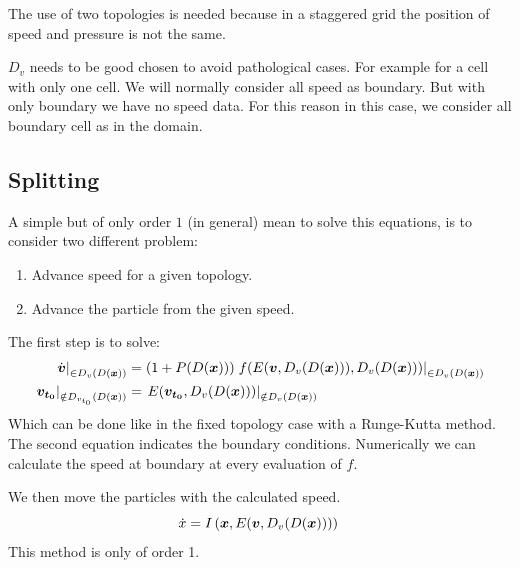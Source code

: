 The use of two topologies is needed because in a staggered grid the position of speed and pressure is not the same.

\begin{remark}
$D_{v}$ needs to be good chosen to avoid pathological cases.
For example for a cell with only one cell. We will normally consider all speed as boundary. But with only boundary we have no speed data.
For this reason in this case, we consider all boundary cell as in the domain.
\end{remark}


\subsection{Splitting}
\label{splitting}

A simple but of only order $1$ (in general) mean to solve this equations, is to consider two different problem:
\begin{enumerate}
	\item Advance speed for a given topology.
	\item Advance the particle from the given speed.
\end{enumerate}
The first step is to solve:
\begin{align}
\left.\dot{{\boldsymbol {v}}}\right|_{\in D_{v}(D({\boldsymbol {x}}))}&=\left(1+P(D({\boldsymbol {x}}))\right)\left.f(E({\boldsymbol {v}},D_v(D({\boldsymbol {x}}))),D_{v}(D({\boldsymbol {x}})))\right|_{\in D_{v}(D({\boldsymbol {x}}))}\\
	\left.{\boldsymbol {v_{t_0}}}\right|_{\notin D_{v_{t_0}}(D({\boldsymbol {x}}))}&=\left.E({\boldsymbol {v_{t_0}}},D_v(D({\boldsymbol {x}})))\right|_{\notin D_{v}(D({\boldsymbol {x}}))}
\end{align}
Which can be done like in the fixed topology case with a Runge-Kutta method. The second equation indicates the boundary conditions.
Numerically we can calculate the speed at boundary at every evaluation of $f$.

We then move the particles with the calculated speed.
\begin{equation}
	\dot{x}=I\left({\boldsymbol {x}},E({\boldsymbol {v}},D_v(D({\boldsymbol {x}})))\right)\\
\end{equation}
This method is only of order 1.

